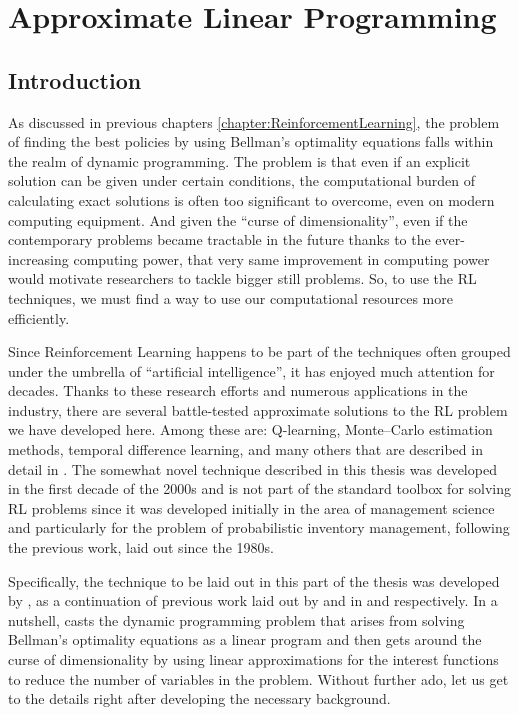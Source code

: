 \chapter{Approximate Linear Programming}
\label{chapter:ApproximateLinearP}
\section{Introduction}

As discussed in previous chapters \ref{chapter:ReinforcementLearning}, the
problem of finding the best policies by using Bellman's optimality equations
falls within the realm of dynamic programming. The problem is that even if an
explicit solution can be given under certain conditions, the computational
burden of calculating exact solutions is often too significant to overcome, even
on modern computing equipment. And given the ``curse of dimensionality'', even
if the contemporary problems became tractable in the future thanks to the
ever-increasing computing power, that very same improvement in computing power
would motivate researchers to tackle bigger still problems. So, to use the RL
techniques, we must find a way to use our computational resources more
efficiently. 

Since Reinforcement Learning happens to be part of the techniques often grouped
under the umbrella of ``artificial intelligence'', it has enjoyed much attention
for decades. Thanks to these research efforts and numerous applications in the
industry, there are several battle-tested approximate solutions to the RL
problem we have developed here. Among these are: Q-learning, Monte--Carlo
estimation methods, temporal difference learning, and many others that are
described in detail in \cite[Chapter~4]{SuttonBarto}. The somewhat novel
technique described in this thesis was developed in the first decade of the
2000s and is not part of the standard toolbox for solving RL problems since it
was developed initially in the area of management science and particularly for
the problem of probabilistic inventory management, following the previous work,
laid out since the 1980s. 

Specifically, the technique to be laid out in this part of the thesis was
developed by \citeauthor*{farias2003LP2ADP}, as a continuation of previous work
laid out by \citeauthor*{denardo1970} and \citeauthor*{depenoux1963} in
\cite{denardo1970} and \cite{depenoux1963} respectively. In a nutshell,
\citeauthor*{farias2002thesis} casts the dynamic programming problem that arises
from solving Bellman's optimality equations as a linear program and then gets
around the curse of dimensionality by using linear approximations for the
interest functions to reduce the number of variables in the problem. Without
further ado, let us get to the details right after developing the necessary
background.

